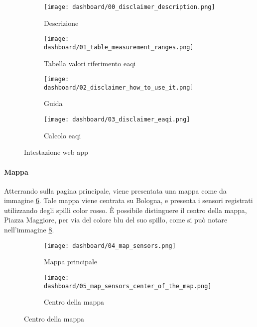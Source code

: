\begin{figure}[H]
  \centering

  \begin{subfigure}{\textwidth}
    \centering
    \texttt{[image: dashboard/00\_disclaimer\_description.png]}
    \caption{Descrizione}
    \label{fig:app-description}
  \end{subfigure}

  \hfill
  \begin{subfigure}{\textwidth}
    \centering
    \texttt{[image: dashboard/01\_table\_measurement\_ranges.png]}
    \caption{Tabella valori riferimento \acrfull{eaqi}}
    \label{fig:app-eaqi-table}
  \end{subfigure}


  \hfill
  \begin{subfigure}{\textwidth}
    \centering
    \texttt{[image: dashboard/02\_disclaimer\_how\_to\_use\_it.png]}
    \caption{Guida}
    \label{fig:app-guide}
  \end{subfigure}

  \hfill
  \begin{subfigure}{\textwidth}
    \centering
    \texttt{[image: dashboard/03\_disclaimer\_eaqi.png]}
    \caption{Calcolo \acrfull{eaqi}}
    \label{fig:app-eaqi-calculation}
  \end{subfigure}

  \caption{Intestazione web app}
  \label{fig:app-heading}
\end{figure}

\paragraph{Mappa}

Atterrando sulla pagina principale, viene presentata una mappa come da immagine \ref{fig:app-map-sensors}.
Tale mappa viene centrata su Bologna, e presenta i sensori registrati utilizzando degli spilli color rosso.
È possibile distinguere il centro della mappa, Piazza Maggiore, per via del colore blu del suo spillo,
come si può notare nell'immagine \ref{fig:app-map-center}.

\begin{figure}[H]
  \centering
  \begin{subfigure}{\textwidth}
    \centering
    \texttt{[image: dashboard/04\_map\_sensors.png]}
    \caption{Mappa principale}
    \label{fig:app-map-sensors}
  \end{subfigure}

  \hfill
  \begin{subfigure}{\textwidth}
    \centering
    \texttt{[image: dashboard/05\_map\_sensors\_center\_of\_the\_map.png]}
    \caption{Centro della mappa}
    \label{fig:app-map-center}
  \end{subfigure}
\end{figure}

